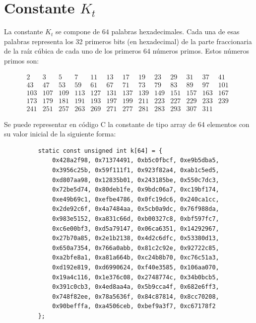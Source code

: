 \documentclass{article}
\begin{document}
\section{Constante $K_{t}$}
    La constante $K_{t}$ se compone de $64$ palabras hexadecimales. Cada una de esas palabras representa los 32 primeros bits (en hexadecimal) de la parte fraccionaria de la raíz cúbica de cada uno de los primeros 64 números primos. Estos números primos son:
        \begin{figure}[H]
        \centering
        $\begin{array}{llllllllllllllll}
            2 & 3 & 5 & 7 & 11 & 13 & 17 & 19 & 23 & 29 & 31 & 37 & 41 \\
            43 & 47 & 53 & 59 & 61 & 67 & 71 & 73 & 79 & 83 & 89 & 97 & 101 \\
            103 & 107 & 109 & 113 & 127 & 131 & 137 & 139 & 149 & 151 & 157 & 163 & 167 \\
            173 & 179 & 181 & 191 & 193 & 197 & 199 & 211 & 223 & 227 & 229 & 233 & 239 \\
            241 & 251 & 257 & 263 & 269 & 271 & 277 & 281 & 283 & 293 & 307 & 311 & 
        \end{array}$
        \end{figure}
    
    Se puede representar en código C la constante de tipo array de 64 elementos con su valor inicial de la siguiente forma:
        \begin{figure}[H]
        \centering
            \begin{verbatim}
    static const unsigned int k[64] = {
    	0x428a2f98, 0x71374491, 0xb5c0fbcf, 0xe9b5dba5,
    	0x3956c25b, 0x59f111f1, 0x923f82a4, 0xab1c5ed5,
    	0xd807aa98, 0x12835b01, 0x243185be, 0x550c7dc3,
    	0x72be5d74, 0x80deb1fe, 0x9bdc06a7, 0xc19bf174,
    	0xe49b69c1, 0xefbe4786, 0x0fc19dc6, 0x240ca1cc,
    	0x2de92c6f, 0x4a7484aa, 0x5cb0a9dc, 0x76f988da,
    	0x983e5152, 0xa831c66d, 0xb00327c8, 0xbf597fc7,
    	0xc6e00bf3, 0xd5a79147, 0x06ca6351, 0x14292967,
    	0x27b70a85, 0x2e1b2138, 0x4d2c6dfc, 0x53380d13,
    	0x650a7354, 0x766a0abb, 0x81c2c92e, 0x92722c85,
    	0xa2bfe8a1, 0xa81a664b, 0xc24b8b70, 0xc76c51a3,
    	0xd192e819, 0xd6990624, 0xf40e3585, 0x106aa070,
    	0x19a4c116, 0x1e376c08, 0x2748774c, 0x34b0bcb5,
    	0x391c0cb3, 0x4ed8aa4a, 0x5b9cca4f, 0x682e6ff3,
    	0x748f82ee, 0x78a5636f, 0x84c87814, 0x8cc70208,
    	0x90befffa, 0xa4506ceb, 0xbef9a3f7, 0xc67178f2
    };
            \end{verbatim}
        \end{figure}
\end{document}
